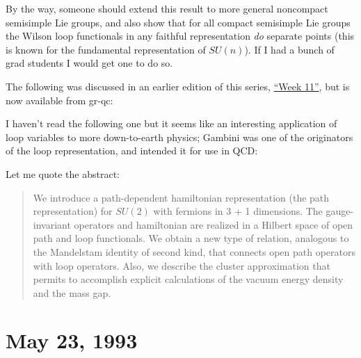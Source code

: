 \documentclass{article}
\def\tightlist{}
\renewcommand{\texttt}[1]{%
  \begingroup
  \ttfamily
  \begingroup\lccode`~=`/\lowercase{\endgroup\def~}{/\discretionary{}{}{}}%
  \begingroup\lccode`~=`[\lowercase{\endgroup\def~}{[\discretionary{}{}{}}%
  \begingroup\lccode`~=`.\lowercase{\endgroup\def~}{.\discretionary{}{}{}}%
  \catcode`/=\active\catcode`[=\active\catcode`.=\active
  \scantokens{#1\noexpand}%
  \endgroup
}
\begin{document}
By the way, someone should extend this result to more general noncompact
semisimple Lie groups, and also show that for all compact semisimple Lie
groups the Wilson loop functionals in any faithful representation
\emph{do} separate points (this is known for the fundamental
representation of \(SU(n)\)). If I had a bunch of grad students I would
get one to do so.

The following was discussed in an earlier edition of this series,
\protect\hyperlink{week11}{``Week 11''}, but is now available from
gr-qc:


I haven't read the following one but it seems like an interesting
application of loop variables to more down-to-earth physics; Gambini was
one of the originators of the loop representation, and intended it for
use in QCD:


Let me quote the abstract:

\begin{quote}
We introduce a path-dependent hamiltonian representation (the path
representation) for \(SU(2)\) with fermions in 3 + 1 dimensions. The
gauge-invariant operators and hamiltonian are realized in a Hilbert
space of open path and loop functionals. We obtain a new type of
relation, analogous to the Mandelstam identity of second kind, that
connects open path operators with loop operators. Also, we describe the
cluster approximation that permits to accomplish explicit calculations
of the vacuum energy density and the mass gap.
\end{quote}
\hypertarget{week15}{%
\section{May 23, 1993}\label{week15}}
\end{document}
